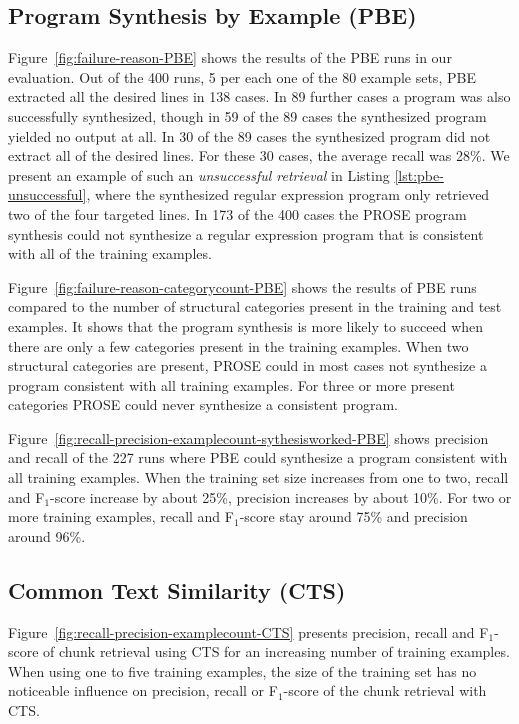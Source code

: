 \subsection{Program Synthesis by Example (PBE)}
Figure~\ref{fig:failure-reason-PBE} shows the results of the PBE runs in our evaluation.
Out of the 400 runs, 5 per each one of the 80 example sets, PBE extracted all the desired lines in 138 cases.
In 89 further cases a program was also successfully synthesized, though in 59 of the 89 cases the synthesized program yielded no output at all.
In 30 of the 89 cases the synthesized program did not extract all of the desired lines.
For these 30 cases, the average recall was 28\%.
We present an example of such an \emph{unsuccessful retrieval} in Listing \ref{lst:pbe-unsuccessful}, where the synthesized regular expression program only retrieved two of the four targeted lines.
In 173 of the 400 cases the PROSE program synthesis could not synthesize a regular expression program that is consistent with all of the training examples.

Figure~\ref{fig:failure-reason-categorycount-PBE} shows the results of PBE runs compared to the number of structural categories present in the training and test examples.
It shows that the program synthesis is more likely to succeed when there are only a few categories present in the training examples.
When two structural categories are present, PROSE could in most cases not synthesize a program consistent with all training examples.
For three or more present categories PROSE could never synthesize a consistent program.

Figure~\ref{fig:recall-precision-examplecount-sythesisworked-PBE} shows precision and recall of the 227 runs where PBE could synthesize a program consistent with all training examples.
When the training set size increases from one to two, recall and F$_{1}$-score increase by about 25\%, precision increases by about 10\%.
For two or more training examples, recall and F$_{1}$-score stay around 75\% and precision around 96\%.


\subsection{Common Text Similarity (CTS)}
Figure~\ref{fig:recall-precision-examplecount-CTS} presents precision, recall and F$_{1}$-score of chunk retrieval using CTS for an increasing number of training examples.
When using one to five training examples, the size of the training set has no noticeable influence on precision, recall or F$_{1}$-score of the chunk retrieval with CTS.

